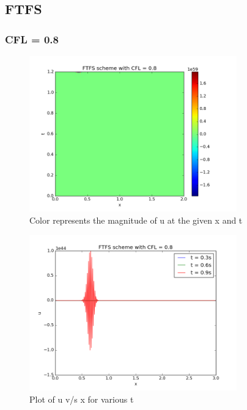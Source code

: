 \documentclass[11pt, a4paper]{article}
\begin{document}
\subsection{FTFS}
\subsubsection{CFL = 0.8}
\begin{figure}[H]
 \centering
 \includegraphics[width = 0.8\textwidth]{FTFS2_08.png}
 \caption{Color represents the magnitude of u at the given x and t}
\end{figure}

\begin{figure}[H]
 \centering
 \includegraphics[width = 0.8\textwidth]{FTFS2_08_1.png}
 \caption{Plot of u v/s x for various t}
\end{figure}
\end{document}
